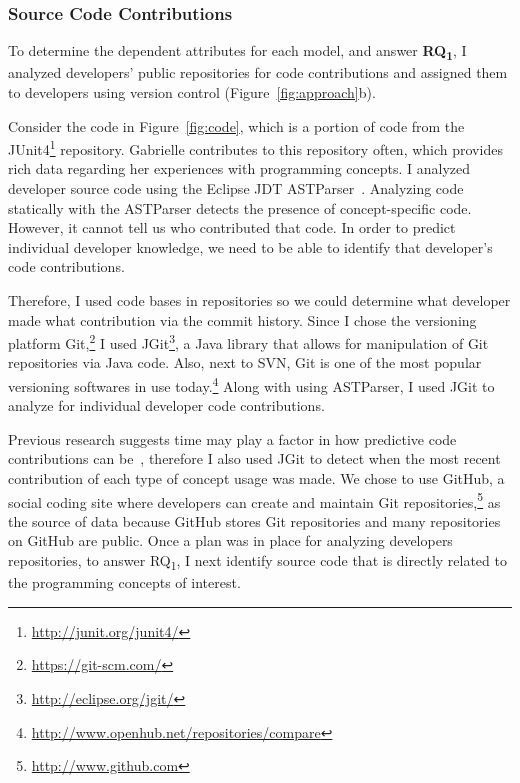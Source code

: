 \subsubsection*{Source Code Contributions} \label{subsec:code}

To determine the dependent attributes for each model, and answer \textbf{RQ\textsubscript{1}}, I analyzed developers' public repositories for code contributions and assigned them to developers using version control (Figure~\ref{fig:approach}b).

Consider the code in Figure~\ref{fig:code}, which is a portion of code from the JUnit4\footnote{\url{http://junit.org/junit4/}} repository. Gabrielle contributes to this repository often, which provides rich data regarding her experiences with programming concepts. I analyzed developer source code using the Eclipse JDT ASTParser~\cite{eclipseASTParser}. Analyzing code statically with the ASTParser detects the presence of concept-specific code. However, it cannot tell us who contributed that code. In order to predict individual developer knowledge, we need to be able to identify that developer's code contributions.

Therefore, I used code bases in repositories so we could determine what developer made what contribution via the commit history. Since I chose the versioning platform Git,\footnote{\url{https://git-scm.com/}} I used JGit\footnote{\url{http://eclipse.org/jgit/}}, a Java library that allows for manipulation of Git repositories via Java code. Also,  next to SVN, Git is one of the most popular versioning softwares in use today.\footnote{\url{http://www.openhub.net/repositories/compare}}  Along with using ASTParser, I used JGit to analyze for individual developer code contributions. 

Previous research suggests time may play a factor in how predictive code contributions can be~\cite{johnson2015bespoke}, therefore I also used JGit to detect when the most recent contribution of each type of concept usage was made.
We chose to use GitHub, a social coding site where developers can create and maintain Git repositories,\footnote{\url{http://www.github.com}} as the source of data because GitHub stores Git repositories and many repositories on GitHub are public.
Once a plan was in place for analyzing developers repositories, to answer RQ\textsubscript{1}, I next identify source code that is directly related to the programming concepts of interest. 


